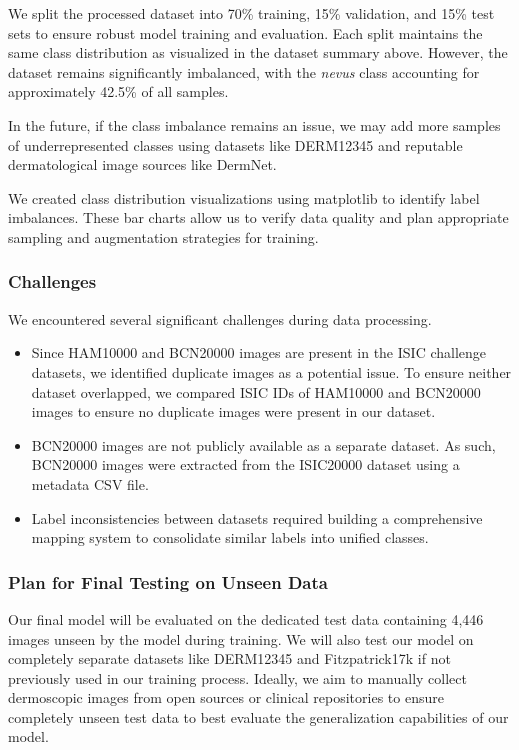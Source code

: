\documentclass{article} %
\begin{document}
We split the processed dataset into 70\% training, 15\% validation, and 15\% test sets to ensure robust model training and evaluation. Each split maintains the same class distribution as visualized in the dataset summary above. However, the dataset remains significantly imbalanced, with the \textit{nevus} class accounting for approximately 42.5\% of all samples.

In the future, if the class imbalance remains an issue, we may add more samples of underrepresented classes using datasets like DERM12345 and reputable dermatological image sources like DermNet.

We created class distribution visualizations using matplotlib to identify label imbalances. These bar charts allow us to verify data quality and plan appropriate sampling and augmentation strategies for training.

\subsubsection{Challenges}

We encountered several significant challenges during data processing.

\begin{itemize}
\item Since HAM10000 and BCN20000 images are present in the ISIC challenge datasets, we identified duplicate images as a potential issue. To ensure neither dataset overlapped, we compared ISIC IDs of HAM10000 and BCN20000 images to ensure no duplicate images were present in our dataset.
\item BCN20000 images are not publicly available as a separate dataset. As such, BCN20000 images were extracted from the ISIC20000 dataset using a metadata CSV file.
\item Label inconsistencies between datasets required building a comprehensive mapping system to consolidate similar labels into unified classes.
\end{itemize}

\subsubsection{Plan for Final Testing on Unseen Data}

Our final model will be evaluated on the dedicated test data containing 4,446 images unseen by the model during training. We will also test our model on completely separate datasets like DERM12345 and Fitzpatrick17k if not previously used in our training process. Ideally, we aim to manually collect dermoscopic images from open sources or clinical repositories to ensure completely unseen test data to best evaluate the generalization capabilities of our model.
\end{document}
